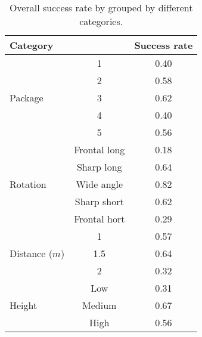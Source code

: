 \begin{table}%
\centering
\begin{tabular}{lcc}
\toprule
\multicolumn{2}{l}{Category} & Success rate\\
\midrule

\multirow{5}{*}{Package} 
& 1 & 0.40  \\
& 2 & 0.58  \\
& 3 & 0.62  \\
& 4 & 0.40  \\
& 5 & 0.56  \\
\midrule

\multirow{5}{*}{Rotation}
& Frontal long		& 0.18 \\ 
& Sharp long		& 0.64 \\
& Wide angle 		& 0.82 \\
& Sharp short 		& 0.62 \\
& Frontal hort		& 0.29 \\
\midrule
\multirow{3}{*}{Distance ($m$)} 
& 1 			& 0.57 \\
& 1.5  			& 0.64 \\
& 2 			& 0.32 \\
\midrule
\multirow{3}{*}{Height} 
& Low 		& 0.31 \\
& Medium 	& 0.67 \\
& High		& 0.56 \\
\bottomrule
 \end{tabular}
 \caption{Overall success rate by grouped by different categories.}
\label{table:overall_categories}
\end{table}